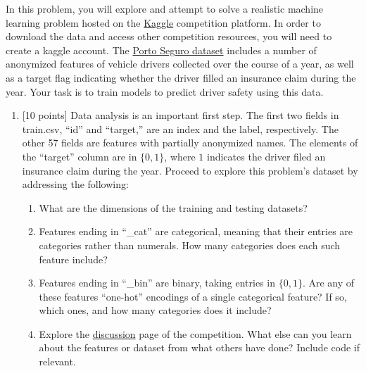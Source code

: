 \documentclass[12pt]{article}
\newenvironment{problem}[2][Problem:]{\begin{trivlist}
\item[\hskip \labelsep {\bfseries #1}\hskip \labelsep {\bfseries #2.}]}{\end{trivlist}}
\begin{document}
\begin{problem}{Porto Seguro Dataset [75 points]}
In this problem, you will explore and attempt to solve a realistic machine learning problem hosted on the \href{https://www.kaggle.com/}{Kaggle} competition platform.
In order to download the data and access other competition resources, you will need to create a kaggle account. 
The \href{https://www.kaggle.com/c/porto-seguro-safe-driver-prediction/data}{Porto Seguro dataset} includes a number of anonymized features of vehicle drivers collected over the course of a year, as well as a target flag indicating whether the driver filled an insurance claim during the year.
Your task is to train models to predict driver safety using this data. 

\begin{enumerate}
    \item {[10 points]} 
    Data analysis is an important first step. 
    The first two fields in train.csv, ``id'' and ``target,'' are an index and the label, respectively. 
    The other 57 fields are features with partially anonymized names. 
    The elements of the ``target'' column are in $\{0,1\}$, where $1$ indicates the driver filed an insurance claim during the year.
    Proceed to explore this problem's dataset by addressing the following:
    \begin{enumerate}
            \item What are the dimensions of the training and testing datasets?
            \item Features ending in ``\_cat'' are categorical, meaning that their entries are categories rather than numerals. How many categories does each such feature include?
            \item Features ending in ``\_bin'' are binary, taking entries in $\{0,1\}$. Are any of these features ``one-hot'' encodings of a single categorical feature? If so, which ones, and how many categories does it include? 
            \item Explore the \href{https://www.kaggle.com/c/porto-seguro-safe-driver-prediction/discussion}{discussion} page of the competition. What else can you learn about the features or dataset from what others have done? Include code if relevant.
    \end{enumerate}


\end{enumerate}
\end{problem}
\end{document}
